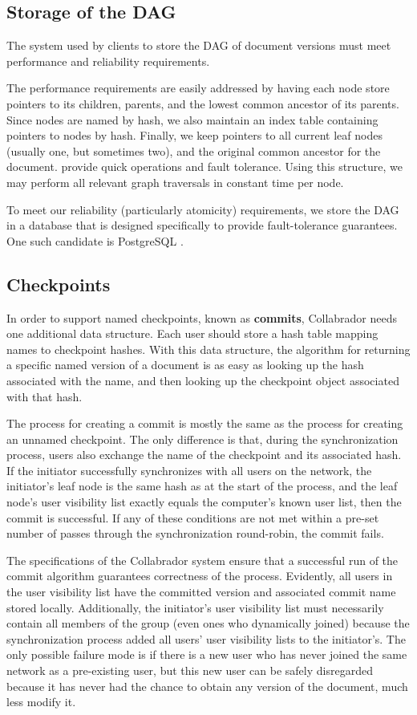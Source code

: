 \documentclass[11pt,titlepage]{article}
\begin{document}
\subsection{Storage of the DAG}

The system used by clients to store the DAG of document versions must
meet performance and reliability requirements.

The performance requirements are easily addressed by having each node
store pointers to its children, parents, and the lowest common
ancestor of its parents.  Since nodes are named by hash, we also
maintain an index table containing pointers to nodes by hash.
Finally, we keep pointers to all current leaf nodes (usually one, but
sometimes two), and the original common ancestor for the document.
provide quick operations and fault tolerance.  Using this structure,
we may perform all relevant graph traversals in constant time per
node.

To meet our reliability (particularly atomicity) requirements, we
store the DAG in a database that is designed specifically to provide
fault-tolerance guarantees.  One such candidate is PostgreSQL
\cite{postgres}.

\subsection{Checkpoints}

In order to support named checkpoints, known as \textbf{commits}, Collabrador needs one additional data structure. Each user should store a hash table mapping names to checkpoint hashes. With this data structure, the algorithm for returning a specific named version of a document is as easy as looking up the hash associated with the name, and then looking up the checkpoint object associated with that hash.

The process for creating a commit is mostly the same as the process for creating an unnamed checkpoint. The only difference is that, during the synchronization process, users also exchange the name of the checkpoint and its associated hash. If the initiator successfully synchronizes with all users on the network, the initiator's leaf node is the same hash as at the start of the process, and the leaf node's user visibility list exactly equals the computer's known user list, then the commit is successful. If any of these conditions are not met within a pre-set number of passes through the synchronization round-robin, the commit fails.

The specifications of the Collabrador system ensure that a successful run of the commit algorithm guarantees correctness of the process. Evidently, all users in the user visibility list have the committed version and associated commit name stored locally. Additionally, the initiator's user visibility list must necessarily contain all members of the group (even ones who dynamically joined) because the synchronization process added all users' user visibility lists to the initiator's. The only possible failure mode is if there is a new user who has never joined the same network as a pre-existing user, but this new user can be safely disregarded because it has never had the chance to obtain any version of the document, much less modify it.
\end{document}
